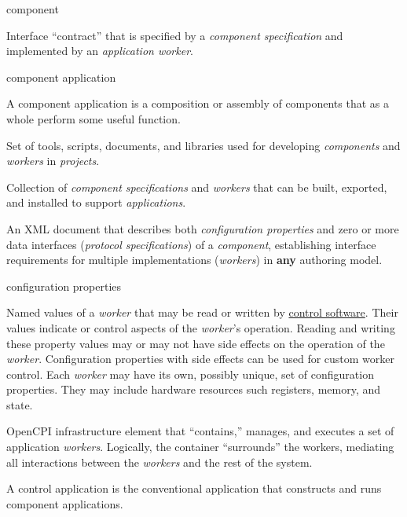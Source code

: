 \documentclass[10pt, a4paper, oneside]{article}
\renewcommand\_{\textunderscore\allowbreak} %
\begin{document}
\begin{description}[style=nextline]
\item[Component] \hypertarget{component}{component}
Interface ``contract'' that is specified by a \textit{component specification} and implemented by an \textit{application worker}.

\item[\emph{Component Application}] \hypertarget{component application}{component application}
A component application is a composition or assembly of components that as a whole perform some useful function.

\item[Component Development Kit]
Set of tools, scripts, documents, and libraries used for developing \textit{components} and \textit{workers} in \textit{projects}.

\item[Component Library]
Collection of \textit{component specifications} and \textit{workers} that can be built, exported, and installed to support \textit{applications}.

\item[Component Specification (OCS)]
An XML document that describes both \textit{configuration properties} and zero or more data interfaces (\textit{protocol specifications}) of a \textit{component}, establishing interface requirements for multiple implementations (\textit{workers}) in \textbf{any} authoring model.

\item [\emph{Configuration Properties}]\hypertarget{configuration properties}{configuration properties}
Named values of a \textit{worker} that may be read or written by \hyperlink{control software}{control software}. Their values indicate or control aspects of the \textit{worker}'s operation. Reading and writing these property values may or may not have side effects on the operation of the \textit{worker}. Configuration properties with side effects can be used for custom worker control. Each \textit{worker} may have its own, possibly unique, set of configuration properties. They may include hardware resources such registers, memory, and state.

\item[Containers]
OpenCPI infrastructure element that ``contains,'' manages, and executes a set of application \textit{workers}. Logically, the container ``surrounds'' the workers, mediating all interactions between the \textit{workers} and the rest of the system.

\item [\emph{Control-Application}]
A control application is the conventional application that constructs and runs component applications.


\end{description}
\end{document}
